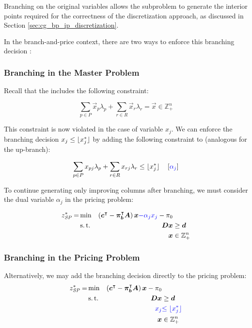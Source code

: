 \begin{note}
Branching on the original variables allows the subproblem to generate the interior points required for the correctness of the discretization approach, as discussed in Section \ref{sec:cg_bp_ip_discretization}.
\end{note}

In the branch-and-price context, there are two ways to enforce this branching decision \cite{thebook}:

\subsubsection{Branching in the Master Problem}
Recall that the \MP{} includes the following constraint:

\begin{equation}
\sum_{p \in P} \vec{x}_p \lambda_p + \sum_{r \in R} \vec{x}_r \lambda_r = \vec{x} \in \mathbb{Z}_+^n
\end{equation}

This constraint is now violated in the case of variable $x_j$. We can enforce the branching decision $x_j \leq \lfloor x_j^*\rfloor$ by adding the following constraint to \MP{} (analogous for the up-branch):

\begin{equation}
\sum_{p \in P} x_{pj} \lambda_p + \sum_{r \in R} x_{rj} \lambda_r \leq \lfloor x_j^*\rfloor \quad \left[{\color{blue} \alpha_j }\right]
\end{equation}

To continue generating only improving columns after branching, we must consider the dual variable $\alpha_j$ in the pricing problem:

\begin{equation}
\begin{aligned}
z^*_\SP{} = &\min & \left( \vec{c}\transpose - \vec{\pi}_\vec{b}\transpose \mat{A} \right) \vec{x} {\color{blue} - \alpha_j x_j} - \pi_0 & \\
&\st & \mat{D} \vec{x} & \geq \vec{d} \\
&& \vec{x} & \in \mathbb{Z}_+^n
\end{aligned}
\end{equation}

\subsubsection{Branching in the Pricing Problem}
Alternatively, we may add the branching decision directly to the pricing problem:
\begin{equation}
\begin{aligned}
z^*_\SP{} = &\min & \left( \vec{c}\transpose - \vec{\pi}_\vec{b}\transpose \mat{A} \right) \vec{x} - \pi_0 & \\
&\st & \mat{D} \vec{x} & \geq \vec{d} \\
&& {\color{blue} x_j} & {\color{blue} \leq \floor{x_j^*}}\\
&& \vec{x} & \in \mathbb{Z}_+^n
\end{aligned}
\end{equation}

